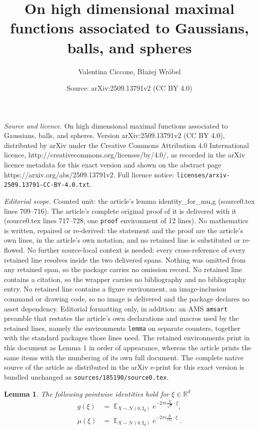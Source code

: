 \documentclass[10pt,a4paper]{amsart}
\title{On high dimensional maximal functions associated to Gaussians, balls, and spheres}
\author{Valentina Ciccone, B{\l}a{\.z}ej Wr{\'o}bel}
\date{Source: arXiv:2509.13791v2 (CC BY 4.0)}
\newtheorem{lemma}{Lemma}
\newcommand{\R}{{\mathbb R}}
\begin{document}
\maketitle

\noindent\emph{Source and licence.} On high dimensional maximal functions associated to Gaussians, balls, and spheres. Version arXiv:2509.13791v2 (CC BY 4.0), distributed by arXiv under the Creative Commons Attribution 4.0 International licence, http://creativecommons.org/licenses/by/4.0/, as recorded in the arXiv licence metadata for this exact version and shown on the abstract page https://arxiv.org/abs/2509.13791v2. Full licence notice: \texttt{licenses/arxiv-2509.13791-CC-BY-4.0.txt}.\par\smallskip

\noindent\textit{Editorial scope.} Counted unit: the article's lemma identity\_for\_mu,g (source0.tex lines 709--716). The article's complete original proof of it is delivered with it (source0.tex lines 717--728, one \texttt{proof} environment of 12 lines). No mathematics is written, repaired or re-derived: the statement and the proof are the article's own lines, in the article's own notation, and no retained line is substituted or re-flowed.  No further source-local context is needed: every cross-reference of every retained line resolves inside the two delivered spans.  Nothing was omitted from any retained span, so the package carries no omission record.  No retained line contains a citation, so the wrapper carries no bibliography and no bibliography entry.  No retained line contains a figure environment, an image-inclusion command or drawing code, so no image is delivered and the package declares no asset dependency.  Editorial formatting only, in addition: an AMS \texttt{amsart} preamble that restates the article's own declarations and macros used by the retained lines, namely the environments \texttt{lemma} on separate counters, together with the standard packages those lines need.  The retained environments print in this document as Lemma 1 in order of appearance, whereas the article prints the same items with the numbering of its own full document.  The complete native source of the article as distributed in the arXiv e-print for this exact version is bundled unchanged as \texttt{sources/185190/source0.tex}.
\begin{lemma}\label{lem: identity_for_mu,g} The following pointwise identities hold for $\xi \in \R^d$
\begin{align}
\label{lemma_identity_for_g}
g(\xi)&=\mathop{\mathbb{E}}_{X\sim \mathcal{N}(0,\textrm{I}_d)} e^{- 2\pi i \tfrac{X}{\sqrt{d}}\cdot \xi},\\
\label{lemma_identity_for_mu}
   \mu(\xi) &= \mathop{\mathbb{E}}_{X\sim \mathcal{N}(0,\textrm{I}_d)} e^{-2\pi i \tfrac{X}{|X|}\cdot \xi}~.
\end{align}
\end{lemma}
\end{document}
